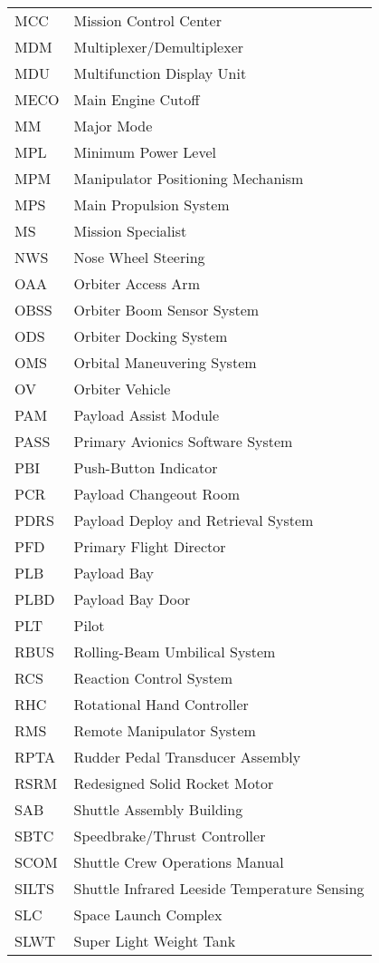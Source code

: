 \documentclass[Space_Shuttle_Vessel_Manual.tex]{subfiles}
\begin{document}
\begin{longtable}{l l }
MCC & Mission Control Center\\
MDM & Multiplexer/Demultiplexer\\
MDU & Multifunction Display Unit\\
MECO & Main Engine Cutoff\\
MM & Major Mode\\
MPL & Minimum Power Level\\
MPM & Manipulator Positioning Mechanism\\
MPS & Main Propulsion System\\
MS & Mission Specialist\\
NWS & Nose Wheel Steering\\
OAA & Orbiter Access Arm\\
OBSS & Orbiter Boom Sensor System\\
ODS & Orbiter Docking System\\
OMS & Orbital Maneuvering System\\
OV & Orbiter Vehicle\\
PAM & Payload Assist Module\\
PASS & Primary Avionics Software System\\
PBI & Push-Button Indicator\\
PCR & Payload Changeout Room\\
PDRS & Payload Deploy and Retrieval System\\
PFD & Primary Flight Director\\
PLB & Payload Bay\\
PLBD & Payload Bay Door\\
PLT & Pilot\\
RBUS & Rolling-Beam Umbilical System\\
RCS & Reaction Control System\\
RHC & Rotational Hand Controller\\
RMS & Remote Manipulator System\\
RPTA & Rudder Pedal Transducer Assembly\\
RSRM & Redesigned Solid Rocket Motor\\
SAB & Shuttle Assembly Building\\
SBTC & Speedbrake/Thrust Controller\\
SCOM & Shuttle Crew Operations Manual\\
SILTS & Shuttle Infrared Leeside Temperature Sensing\\
SLC & Space Launch Complex\\
SLWT & Super Light Weight Tank\\

\end{longtable}
\end{document}
